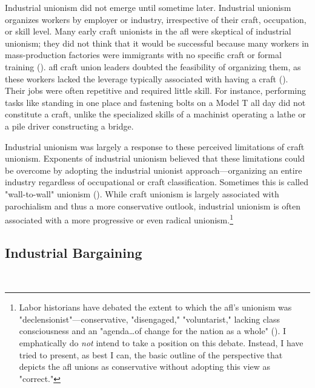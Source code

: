 \documentclass[12pt]{article}
\begin{document}
Industrial unionism did not emerge until sometime later. Industrial unionism organizes workers by employer or industry, irrespective of their craft, occupation, or skill level. Many early craft unionists in the \acrshort{afl} were skeptical of industrial unionism; they did not think that it would be successful because many workers in mass-production factories were immigrants with no specific craft or formal training (\cite{fonerHistoryLaborMovement1981a}). \acrshort{afl} craft union leaders doubted the feasibility of organizing them, as these workers lacked the leverage typically associated with having a craft (\cite{fonerHistoryLaborMovement1994}). Their jobs were often repetitive and required little skill. For instance, performing tasks like standing in one place and fastening bolts on a Model T all day did not constitute a craft, unlike the specialized skills of a machinist operating a lathe or a pile driver constructing a bridge.

Industrial unionism was largely a response to these perceived limitations of craft unionism. Exponents of industrial unionism believed that these limitations could be overcome by adopting the industrial unionist approach---organizing an entire industry regardless of occupational or craft classification. Sometimes this is called "wall-to-wall" unionism (\cite{meyersWhatAreMy2023}). While craft unionism is largely associated with parochialism and thus a more conservative outlook, industrial unionism is often associated with a more progressive or even radical unionism.\footnote{Labor historians have debated the extent to which the \acrshort{afl}'s unionism was "declensionist"---conservative, "disengaged," "voluntarist," lacking class consciousness and an "agenda\ldots{}of change for the nation as a whole" (\cite[61–62]{cobblePureSimpleRadicalism2013}). I emphatically do \emph{not} intend to take a position on this debate. Instead, I have tried to present, as best I can, the basic outline of the perspective that depicts the \acrshort{afl} unions as conservative without adopting this view as "correct."}

\subsection{Industrial Bargaining}\label{sub:ind_bargain}\
\end{document}
